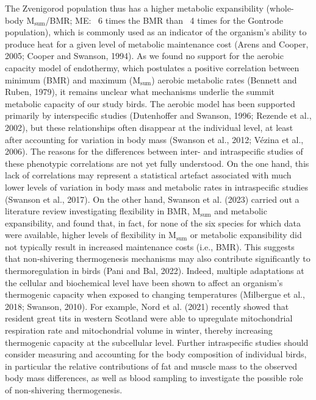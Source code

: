 \documentclass[10pt, twoside]{book} %
\begin{document}
The Zvenigorod population thus has a higher metabolic expansibility (whole-body M$_{\text{sum}}$/BMR; ME: ~6 times the BMR than ~4 times for the Gontrode population), which is commonly used as an indicator of the organism's ability to produce heat for a given level of metabolic maintenance cost (Arens and Cooper, 2005; Cooper and Swanson, 1994). As we found no support for the aerobic capacity model of endothermy, which postulates a positive correlation between minimum (BMR) and maximum (M$_{\text{sum}}$) aerobic metabolic rates (Bennett and Ruben, 1979), it remains unclear what mechanisms underlie the summit metabolic capacity of our study birds. The aerobic model has been supported primarily by interspecific studies (Dutenhoffer and Swanson, 1996; Rezende et al., 2002), but these relationships often disappear at the individual level, at least after accounting for variation in body mass (Swanson et al., 2012; Vézina et al., 2006). The reasons for the differences between inter- and intraspecific studies of these phenotypic correlations are not yet fully understood. On the one hand, this lack of correlations may represent a statistical artefact associated with much lower levels of variation in body mass and metabolic rates in intraspecific studies (Swanson et al., 2017). On the other hand, Swanson et al. (2023) carried out a literature review investigating flexibility in BMR, M$_{\text{sum}}$ and metabolic expansibility, and found that, in fact, for none of the six species for which data were available, higher levels of flexibility in M$_{\text{sum}}$ or metabolic expansibility did not typically result in increased maintenance costs (i.e., BMR). This suggests that non-shivering thermogenesis mechanisms may also contribute significantly to thermoregulation in birds (Pani and Bal, 2022). Indeed, multiple adaptations at the cellular and biochemical level have been shown to affect an organism's thermogenic capacity when exposed to changing temperatures (Milbergue et al., 2018; Swanson, 2010). For example, Nord et al. (2021) recently showed that resident great tits in western Scotland were able to upregulate mitochondrial respiration rate and mitochondrial volume in winter, thereby increasing thermogenic capacity at the subcellular level. Further intraspecific studies should consider measuring and accounting for the body composition of individual birds, in particular the relative contributions of fat and muscle mass to the observed body mass differences, as well as blood sampling to investigate the possible role of non-shivering thermogenesis. \\
\end{document}

